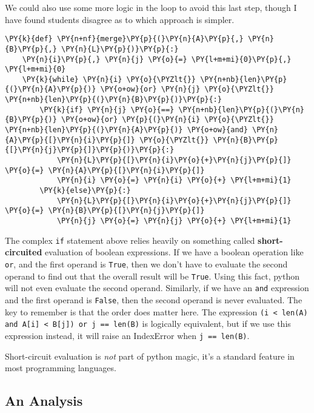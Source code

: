 We could also use some more logic in the loop to avoid this last step, though I have found students disagree as to which approach is simpler.

\begin{Verbatim}[commandchars=\\\{\}]
\PY{k}{def} \PY{n+nf}{merge}\PY{p}{(}\PY{n}{A}\PY{p}{,} \PY{n}{B}\PY{p}{,} \PY{n}{L}\PY{p}{)}\PY{p}{:}
    \PY{n}{i}\PY{p}{,} \PY{n}{j} \PY{o}{=} \PY{l+m+mi}{0}\PY{p}{,} \PY{l+m+mi}{0}
    \PY{k}{while} \PY{n}{i} \PY{o}{\PYZlt{}} \PY{n+nb}{len}\PY{p}{(}\PY{n}{A}\PY{p}{)} \PY{o+ow}{or} \PY{n}{j} \PY{o}{\PYZlt{}} \PY{n+nb}{len}\PY{p}{(}\PY{n}{B}\PY{p}{)}\PY{p}{:}
        \PY{k}{if} \PY{n}{j} \PY{o}{==} \PY{n+nb}{len}\PY{p}{(}\PY{n}{B}\PY{p}{)} \PY{o+ow}{or} \PY{p}{(}\PY{n}{i} \PY{o}{\PYZlt{}} \PY{n+nb}{len}\PY{p}{(}\PY{n}{A}\PY{p}{)} \PY{o+ow}{and} \PY{n}{A}\PY{p}{[}\PY{n}{i}\PY{p}{]} \PY{o}{\PYZlt{}} \PY{n}{B}\PY{p}{[}\PY{n}{j}\PY{p}{]}\PY{p}{)}\PY{p}{:}
            \PY{n}{L}\PY{p}{[}\PY{n}{i}\PY{o}{+}\PY{n}{j}\PY{p}{]} \PY{o}{=} \PY{n}{A}\PY{p}{[}\PY{n}{i}\PY{p}{]}
            \PY{n}{i} \PY{o}{=} \PY{n}{i} \PY{o}{+} \PY{l+m+mi}{1}
        \PY{k}{else}\PY{p}{:}
            \PY{n}{L}\PY{p}{[}\PY{n}{i}\PY{o}{+}\PY{n}{j}\PY{p}{]} \PY{o}{=} \PY{n}{B}\PY{p}{[}\PY{n}{j}\PY{p}{]}
            \PY{n}{j} \PY{o}{=} \PY{n}{j} \PY{o}{+} \PY{l+m+mi}{1}
\end{Verbatim}



The complex \texttt{if} statement above relies heavily on something called \textbf{short-circuited} evaluation of boolean expressions.
If we have a boolean operation like \texttt{or}, and the first operand is \texttt{True}, then we don't have to evaluate the second operand to find out that the overall result will be \texttt{True}.
Using this fact, python will not even evaluate the second operand.
Similarly, if we have an \texttt{and} expression and the first operand is \texttt{False}, then the second operand is never evaluated.
The key to remember is that the order does matter here.
The expression \texttt{(i < len(A) and A[i] < B[j]) or j == len(B)} is logically equivalent, but if we use this  expression instead, it will raise an IndexError when \texttt{j == len(B)}.


Short-circuit evaluation is \emph{not} part of python magic, it's a standard feature in most programming languages.

\subsection{An Analysis}


